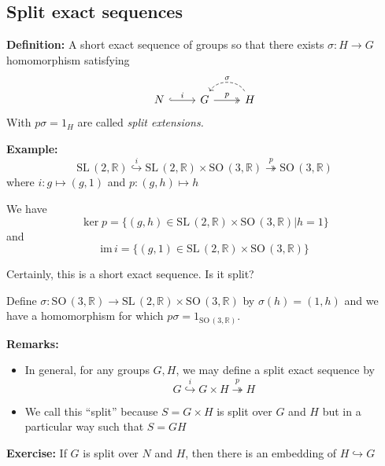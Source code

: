 \documentclass[12pt]{article}
\newcommand{\R}{\mathbb{R}}
\newcommand{\SL}{\text{SL}\,}
\newcommand{\SO}{\text{SO}\,}
\newcommand{\im}{\text{im}\,}
\begin{document}
\subsection*{Split exact sequences}
    \textbf{Definition:} A short exact sequence of groups so that there exists $\sigma: H \to G$ homomorphism satisfying 
    \[\begin{tikzcd}
        N \arrow[hook]{r}{i} & G \arrow[two heads]{r}{p} & H \arrow[swap, dashed, bend right=60]{l}{\sigma} 
    \end{tikzcd}\]
    With $p\sigma = 1_H$ are called \emph{split extensions.} 

    \textbf{Example:} 
    \[\SL(2, \R) \overset{i}{\hookrightarrow} \SL(2, \R) \times \SO(3, \R) \overset{p}{\twoheadrightarrow} \SO(3, \R)\] 
    where $i: g \mapsto (g, 1)$ and $p: (g, h) \mapsto h$ 

    We have 
    \[\ker p = \{(g, h) \in \SL(2, \R) \times \SO(3, \R) \big\vert h = 1\}\]
    and 
    \[\im i = \{(g, 1) \in \SL(2, \R) \times \SO(3, \R)\}\]

    Certainly, this is a short exact sequence. Is it split? 

    Define $\sigma: \SO(3, \R) \to \SL(2, \R) \times \SO(3, \R)$ by $\sigma(h) = (1, h)$ and we have a homomorphism for which $p\sigma = 1_{\SO(3, \R)}$.

    \textbf{Remarks:} 
    \begin{itemize}
        \item In general, for any groups $G, H$, we may define a split exact sequence by 
        \[G \overset{i}{\hookrightarrow} G \times H \overset{p}{\twoheadrightarrow} H\] 

        \item We call this ``split'' because $S = G \times H$ is split over $G$ and $H$ but in a particular way such that $S = GH$         
    \end{itemize}

    \textbf{Exercise:} If $G$ is split over $N$ and $H$, then there is an embedding of $H \hookrightarrow G$ 
\end{document}
